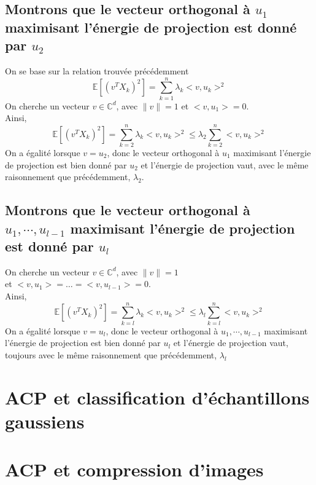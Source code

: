 \documentclass{report}
\begin{document}
		\subsection{Montrons que le vecteur orthogonal à $u_1$ maximisant l'énergie de projection est donné par $u_2$}
			On se base sur la relation trouvée précédemment
			\[ \mathbb{E}[(v^TX_k)^2] = \sum\limits_{k=1}^n \lambda_k<v, u_k>^2 \]
			On cherche un vecteur $v \in \mathbb{C}^d$, avec $\lVert v \rVert = 1$ et $<v, u_1> = 0$. \\
			Ainsi, 
			\[ \mathbb{E}[(v^TX_k)^2] = \sum\limits_{k=2}^n \lambda_k<v, u_k>^2 \leq \lambda_2\sum\limits_{k=2}^n <v, u_k>^2 \]
			On a égalité lorsque $v=u_2$, donc le vecteur orthogonal à $u_1$ maximisant l'énergie de projection est bien donné par $u_2$ et l'énergie de projection vaut, avec le même raisonnement que précédemment, $\lambda_2$.
		\subsection{Montrons que le vecteur orthogonal à $u_1, \cdots, u_{l-1}$ maximisant l'énergie de projection est donné par $u_l$}
			On cherche un vecteur $v \in \mathbb{C}^d$, avec $\lVert v \rVert = 1$ \\
			et $<v, u_1> = \ldots = <v, u_{l-1}> = 0$. \\
			Ainsi, 
			\[ \mathbb{E}[(v^TX_k)^2] = \sum\limits_{k=l}^n \lambda_k<v, u_k>^2 \leq \lambda_l\sum\limits_{k=l}^n <v, u_k>^2 \]
			On a égalité lorsque $v=u_l$, donc le vecteur orthogonal à $u_1, \cdots, u_{l-1}$ maximisant l'énergie de projection est bien donné par $u_l$ et l'énergie de projection vaut, toujours avec le même raisonnement que précédemment, $\lambda_l$

	\section{ACP et classification d'échantillons gaussiens}
	\section{ACP et compression d'images}
\end{document}
